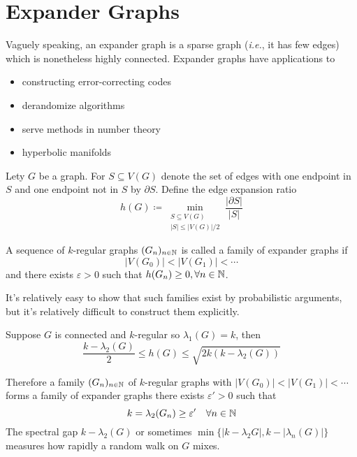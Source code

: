 \section{Expander Graphs}
Vaguely speaking, an expander graph is a sparse graph (\textit{i.e.}, it has few edges) which is nonetheless highly connected.
Expander graphs have applications to
\begin{itemize}
\item constructing error-correcting codes
\item derandomize algorithms
\item serve methods in number theory
\item hyperbolic manifolds
\end{itemize}

\begin{definition}
Lety \(G\) be a graph.
For \(S\subseteq V(G)\) denote the set of edges with one endpoint in \(S\) and one endpoint not in \(S\) by \(\partial S\).
Define the edge expansion ratio
\[ h(G)\coloneqq \min_{\substack{S\subseteq V(G)\\|S|\leq|V(G)|/2}} \frac{|\partial S|}{|S|} \]
\end{definition}
\begin{definition}
A sequence of \(k\)-regular graphs \((G_n)_{n\in\mathbb{N}}\) is called a family of expander graphs if
\[ |V(G_0)|<|V(G_1)|<\cdots \]
and there exists \(\varepsilon>0\) such that \(h(G_n)\geq0,\forall n\in\mathbb{N}\).
\end{definition}
\begin{remark}
It's relatively easy to show that such families exist by probabilistic arguments, but it's relatively difficult to construct them explicitly.
\end{remark}
\begin{theorem}
Suppose \(G\) is connected and \(k\)-regular so \(\lambda_1(G)=k\), then
\[ \frac{k-\lambda_2(G)}{2}\leq h(G)\leq \sqrt{2k(k-\lambda_2(G))} \]
\end{theorem}
Therefore a family \((G_n)_{n\in\mathbb{N}}\) of \(k\)-regular graphs with \(|V(G_0)|<|V(G_1)|<\cdots\) forms a family of expander graphs \iff there exists \(\varepsilon'>0\) such that
\[ k=\lambda_2(G_n)\geq\varepsilon' \quad \forall n\in\mathbb{N} \]
The spectral gap \(k-\lambda_2(G)\) or sometimes \( \min\{|k-\lambda_2{G}|,k-|\lambda_n(G)|\} \) measures how rapidly a random walk on \(G\) mixes.